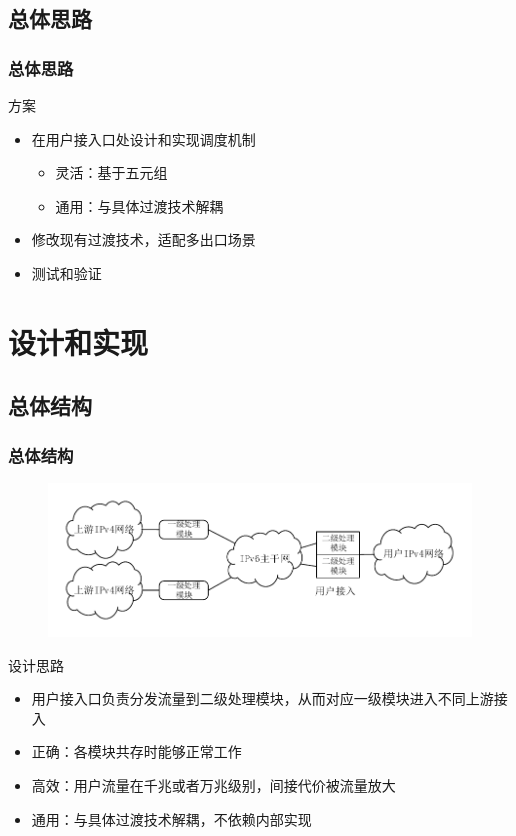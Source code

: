 \documentclass{beamer}
\begin{document}
\subsection{总体思路}
\begin{frame}
  \frametitle{总体思路}

  \begin{block}{方案}
    \begin{itemize}
    \item 在用户接入口处设计和实现调度机制
      \begin{itemize}
      \item 灵活：基于五元组
      \item 通用：与具体过渡技术解耦
      \end{itemize}
    \item 修改现有过渡技术，适配多出口场景
    \item 测试和验证
    \end{itemize}
  \end{block}
\end{frame}

\section{设计和实现}
\subsection{总体结构}
\begin{frame}
  \frametitle{总体结构}
  \vspace{-1em}

  \begin{figure}
    \includegraphics[width=\textwidth]{figs/9-multi-egress.pdf}
  \end{figure}
  \vspace{-1em}

  \begin{block}{设计思路}
    \begin{itemize}
    \item 用户接入口负责分发流量到二级处理模块，从而对应一级模块进入不同上游接入
    \item 正确：各模块共存时能够正常工作
    \item 高效：用户流量在千兆或者万兆级别，间接代价被流量放大
    \item 通用：与具体过渡技术解耦，不依赖内部实现
    \end{itemize}
  \end{block}
\end{frame}
\end{document}
